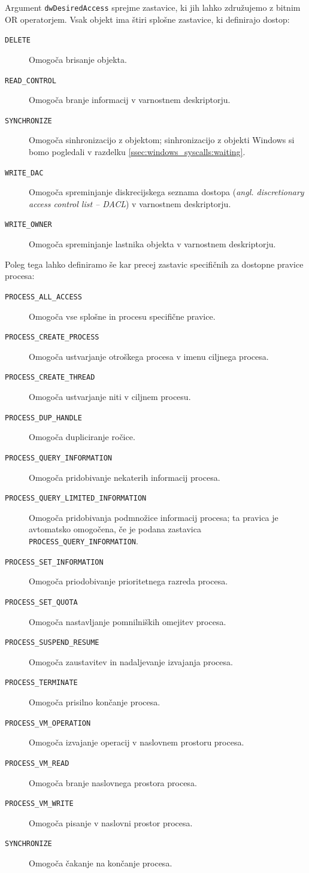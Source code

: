 \documentclass[a4paper,12pt,openright]{book}
\begin{document}
Argument \texttt{dwDesiredAccess} sprejme zastavice, ki jih lahko združujemo z bitnim OR operatorjem.
Vsak objekt ima štiri splošne zastavice, ki definirajo dostop:
\begin{description}
	\item[\texttt{DELETE}] Omogoča brisanje objekta.
	\item[\texttt{READ\_CONTROL}] Omogoča branje informacij v varnostnem deskriptorju.
	\item[\texttt{SYNCHRONIZE}] Omogoča sinhronizacijo z objektom; sinhronizacijo z objekti Windows si bomo pogledali v razdelku \ref{ssec:windows_syscalls:waiting}.
	\item[\texttt{WRITE\_DAC}] Omogoča spreminjanje diskrecijskega seznama dostopa (\textit{angl. discretionary access control list -- DACL}) v varnostnem deskriptorju.
	\item[\texttt{WRITE\_OWNER}] Omogoča spreminjanje lastnika objekta v varnostnem deskriptorju.
\end{description}
Poleg tega lahko definiramo še kar precej zastavic specifičnih za dostopne pravice procesa:
\begin{description}
	\item[\texttt{PROCESS\_ALL\_ACCESS}] Omogoča vse splošne in procesu specifične pravice.
	\item[\texttt{PROCESS\_CREATE\_PROCESS}] Omogoča ustvarjanje otroškega procesa v imenu ciljnega procesa.
	\item[\texttt{PROCESS\_CREATE\_THREAD}] Omogoča ustvarjanje niti v ciljnem procesu.
	\item[\texttt{PROCESS\_DUP\_HANDLE}] Omogoča dupliciranje ročice.
	\item[\texttt{PROCESS\_QUERY\_INFORMATION}] Omogoča pridobivanje nekaterih informacij procesa.
	\item[\texttt{PROCESS\_QUERY\_LIMITED\_INFORMATION}] Omogoča pridobivanja podmnožice informacij procesa; ta pravica je avtomatsko omogočena, če je podana zastavica \texttt{PROCESS\_QUERY\_INFORMATION}.
	\item[\texttt{PROCESS\_SET\_INFORMATION}] Omogoča priodobivanje prioritetnega razreda procesa.
	\item[\texttt{PROCESS\_SET\_QUOTA}] Omogoča nastavljanje pomnilniških omejitev procesa.
	\item[\texttt{PROCESS\_SUSPEND\_RESUME}] Omogoča zaustavitev in nadaljevanje izvajanja procesa.
	\item[\texttt{PROCESS\_TERMINATE}] Omogoča prisilno končanje procesa.
	\item[\texttt{PROCESS\_VM\_OPERATION}] Omogoča izvajanje operacij v naslovnem prostoru procesa.
	\item[\texttt{PROCESS\_VM\_READ}] Omogoča branje naslovnega prostora procesa.
	\item[\texttt{PROCESS\_VM\_WRITE}] Omogoča pisanje v naslovni prostor procesa.
	\item[\texttt{SYNCHRONIZE}] Omogoča čakanje na končanje procesa.
\end{description}
\end{document}
